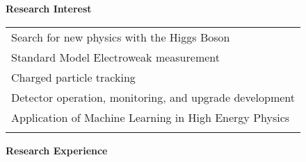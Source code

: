 \documentclass[letterpaper,11pt,oneside]{article}
\begin{document}
 \vspace{-0.25cm}
 \raggedright
 \textbf{\Large{Research Interest} }\\
 \normalsize
 \begin{flushleft}
 \begin{tabular}{@{} l}
     Search for new physics with the Higgs Boson \\
     Standard Model Electroweak measurement \\
     Charged particle tracking \\
     Detector operation, monitoring, and upgrade development \\
     Application of Machine Learning in High Energy Physics \\
     \\
      \end{tabular}
\end{flushleft}
\vspace{-0.25cm}
 \raggedright
 \textbf{\Large{Research Experience}} \\
 \normalsize
\end{document}
